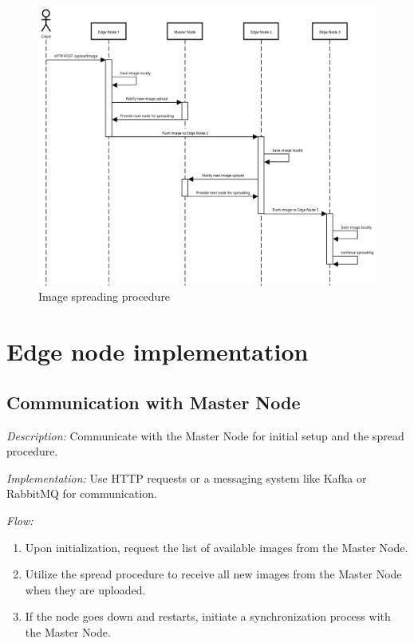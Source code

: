\documentclass{article}
\begin{document}
  \begin{figure}
    \centering
    \includegraphics[width=1.0\textwidth]{imgs/spread_procedure}
    \caption{Image spreading procedure}
    \label{fig:Image spreading procedure}
  \end{figure}




  \newpage






  \section{Edge node implementation}

  \subsection{Communication with Master Node}
  \textit{Description:} Communicate with the Master Node for initial setup and the spread procedure.

  \textit{Implementation:} Use HTTP requests or a messaging system like Kafka or RabbitMQ for communication.

  \textit{Flow:}
  \begin{enumerate}[label=\arabic*.]
    \item Upon initialization, request the list of available images from the Master Node.
    \item Utilize the spread procedure to receive all new images from the Master Node when they are uploaded.
    \item If the node goes down and restarts, initiate a synchronization process with the Master Node.
  \end{enumerate}
\end{document}
